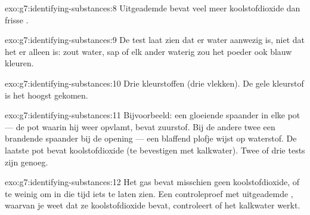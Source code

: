 \begin{solution}{exo:g7:identifying-substances:8}
Uitgeademde  bevat veel meer koolstofdioxide dan frisse .
\end{solution}

\begin{solution}{exo:g7:identifying-substances:9}
De test laat zien dat er water aanwezig is, niet dat het er alleen is:
zout water, sap of elk ander waterig  zou het poeder ook blauw
kleuren.
\end{solution}

\begin{solution}{exo:g7:identifying-substances:10}
Drie kleurstoffen (drie vlekken). De gele kleurstof is het hoogst
gekomen.
\end{solution}

\begin{solution}{exo:g7:identifying-substances:11}
Bijvoorbeeld: een gloeiende spaander in elke pot --- de pot waarin hij
weer opvlamt, bevat zuurstof. Bij de andere twee een brandende spaander
bij de opening --- een blaffend plofje wijst op waterstof. De laatste pot
bevat koolstofdioxide (te bevestigen met kalkwater). Twee of drie tests
zijn genoeg.
\end{solution}

\begin{solution}{exo:g7:identifying-substances:12}
Het gas bevat misschien geen koolstofdioxide, of te weinig om in die tijd
iets te laten zien. Een controleproef met uitgeademde , waarvan je
weet dat ze koolstofdioxide bevat, controleert of het kalkwater werkt.
\end{solution}


